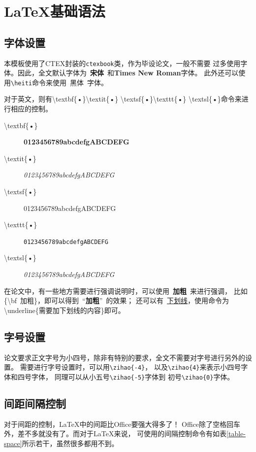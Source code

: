 \chapter{\LaTeX{}基础语法}
\label{chapter-basic}
\section{字体设置}

本模板使用了CTEX封装的\texttt{ctexbook}类，作为毕设论文，一般不需要
过多使用字体。因此，全文默认字体为~{\bf 宋体}~和{\bf Times New Roman}字体。
此外还可以使用\texttt{\textbackslash heiti}命令来使用~{\heiti 黑体}~字体。

对于英文，则有\textbackslash textbf\{•\}\quad\textbackslash textit\{•\}
\quad\textbackslash textsf\{•\}\quad\textbackslash texttt\{•\}
\quad\textbackslash textsl\{•\}命令来进行相应的控制。

\begin{description}
    \item[\textbackslash textbf\{•\}] \textbf{0123456789abcdefgABCDEFG}
    \item[\textbackslash textit\{•\}] \textit{0123456789abcdefgABCDEFG}
    \item[\textbackslash textsf\{•\}] \textsf{0123456789abcdefgABCDEFG}
    \item[\textbackslash texttt\{•\}] \texttt{0123456789abcdefgABCDEFG}
    \item[\textbackslash textsl\{•\}] \textsl{0123456789abcdefgABCDEFG}
\end{description}
在论文中，有一些地方需要进行强调说明时，可以使用~{\bf 加粗}~来进行强调，
比如\{\textbackslash bf~加粗\}，即可以得到~“{\bf 加粗}”~的效果；
还可以有~\underline{下划线}，使用命令为\textbackslash underline\{需要加下划线的内容\}即可。

\section{字号设置}
论文要求正文字号为小四号，除非有特别的要求，全文不需要对字号进行另外的设置。
需要进行字号设置时，可以用\texttt{\textbackslash zihao\{-4\}}，
以及\texttt{\textbackslash zihao\{4\}}来表示小四号字体和四号字体，
同理可以从小五号\texttt{\textbackslash zihao\{-5\}}字体到
初号\texttt{\textbackslash zihao\{0\}}字体。

\section{间距间隔控制}
对于间距的控制，\LaTeX{}中的间距比Office要强大得多了！
Office除了空格回车外，差不多就没有了。而对于\LaTeX{}来说，
可使用的间隔控制命令有如表\ref{table-space}所示若干，虽然很多都用不到。

